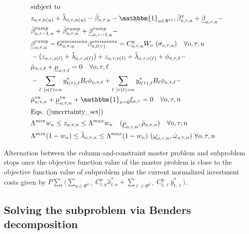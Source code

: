 \documentclass[final]{IEEEtran}
\begin{document}
\begin{align}
&\text{subject to} \nonumber \\
&\label{subproblem_constr_first}z_{o, \tau, n(u)} + \tilde{\lambda}_{o, \tau, n(u)} - \bar{\beta}_{o, \tau, u} - \mathbbm{1}_{u \in \Psi^{G+}} \bar{\beta}^x_{o, \tau, u} + \underline{\beta}_{o, \tau, u} - \nonumber \\
&\bar{\beta}_{o, \tau - 1, u}^{ramp} + \bar{\beta}_{o, \tau, u}^{ramp} + \underline{\beta}_{o, \tau - 1, u}^{ramp} - \nonumber \\
&\underline{\beta}_{o, \tau, u}^{ramp} - G_{o, \tau, u}^{emissions} \beta_{o, t(\tau)}^{emissions} = C^g_{o, \tau, u}  W_o \, \, (\sigma_{o, \tau, u}) \quad \forall o, \tau, u \\
&-(z_{o, \tau, s(\ell)} + \tilde{\lambda}_{o, \tau, s(\ell)}) + z_{o, \tau, r(\ell)} + \tilde{\lambda}_{o, \tau, r(\ell)} + \phi_{o, \tau, \ell} - \nonumber \\
&\bar{\mu}_{o, \tau, \ell} + \underline{\mu}_{o, \tau, \ell} = 0 \quad \forall o, \tau, \ell \\
&-\sum\limits_{\ell | s(\ell) = n} y_{t(\tau), \ell}^* B_\ell \phi_{o, \tau, \ell} + \sum\limits_{\ell | r(\ell) = n} y_{t(\tau), \ell}^* B_\ell \phi_{o, \tau, \ell} - \nonumber \\
&\label{subproblem_constr_last_in_slave}\bar{\mu}^{va}_{o, \tau, n} + \underline{\mu}^{va}_{o, \tau, n} + \mathbbm{1}_{n = 0} \xi_{o, \tau} = 0 \quad \forall o, \tau, n \\
&\text{Eqs. } (\ref{uncertainty_set}) \\
&\Lambda^{min} w_n \leq z_{o, \tau, n} \leq \Lambda^{max} w_n \quad (\underline{\rho}_{o, \tau, n}, \bar{\rho}_{o, \tau, n}) \quad \forall o,\tau,n \\
&\Lambda^{min} (1 - w_n) \leq \tilde{\lambda}_{o, \tau, n} \leq \Lambda^{max} (1 - w_n) \, \, (\underline{\omega}_{o, \tau, n}, \bar{\omega}_{o, \tau, n}) \, \, \forall o,\tau,n
\end{align}

Alternation between the column-and-constraint master problem and subproblem stops once the objective function value of the master problem is close to the objective function value of subproblem plus the current normalized investment costs given by $P \sum\limits_{t} \big( \sum\limits_{u \in \Psi^{G+}} C^x_{t, u} \hat{x}_{t, u}^* + \sum\limits_{\ell \in \Psi^{L+}} C^y_{t, \ell} \hat{y}_{t, \ell}^* \big)$.

\subsection{Solving the subproblem via Benders decomposition}
\end{document}
